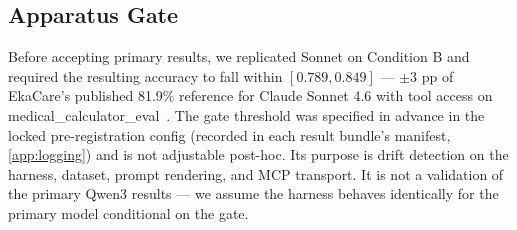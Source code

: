 \subsection{Apparatus Gate}
\label{sec:methods_gate}

Before accepting primary results, we replicated Sonnet on Condition
B and required the resulting accuracy to fall within
$[0.789, 0.849]$ --- $\pm 3$ pp of EkaCare's published 81.9\%
reference for Claude Sonnet 4.6 with tool access on
medical\_calculator\_eval~\citep{ekacare_error_analysis}. The gate
threshold was specified in advance in the locked pre-registration
config (recorded in each result bundle's manifest, \cref{app:logging})
and is not adjustable post-hoc. Its purpose is drift
detection on the harness, dataset, prompt rendering, and MCP
transport. It is not a validation of the primary Qwen3 results ---
we assume the harness behaves identically for the primary model
conditional on the gate.

